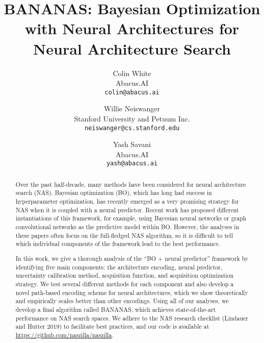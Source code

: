 \documentclass[11pt]{article}
\title{BANANAS: Bayesian Optimization with Neural Architectures
for Neural Architecture Search}
\author{
Colin White
\\
Abacus.AI\\
\texttt{colin@abacus.ai}
\and 
Willie Neiswanger
\\
Stanford University 
and Petuum Inc.\\
\texttt{neiswanger@cs.stanford.edu}
\\
\and
Yash Savani
\\
Abacus.AI\\
\texttt{yash@abacus.ai}
}
\date{}
\numberwithin{equation}{section}
\numberwithin{figure}{section}
\theoremstyle{plain}
\theoremstyle{definition}
\begin{document}
\maketitle

\begin{abstract}

Over the past half-decade, many methods have been considered for 
neural architecture search (NAS). Bayesian optimization (BO),
which has long had success in hyperparameter optimization,
has recently emerged as a very promising strategy for NAS
when it is coupled with a neural predictor.
Recent work has proposed different instantiations of this framework,
for example, using Bayesian neural networks or graph convolutional
networks as the predictive model within BO.
However, the analyses in these papers often focus on the
full-fledged NAS algorithm,
so it is difficult to tell which individual components
of the framework lead to the best performance.

In this work, we give a thorough analysis of the 
``BO + neural predictor'' framework
by identifying five main components:
the architecture encoding, neural predictor,
uncertainty calibration method, acquisition function, 
and acquisition optimization strategy.
We test several different methods for each component and
also develop a novel path-based encoding scheme for neural architectures,
which we show theoretically and empirically scales better than other
encodings.
Using all of our analyses, we develop a final algorithm called BANANAS,
which achieves state-of-the-art performance on NAS search spaces.
We adhere to the NAS research checklist (Lindauer and Hutter 2019) to 
facilitate best practices, and our code is available at 
\url{https://github.com/naszilla/naszilla}.

\end{abstract}
\end{document}
